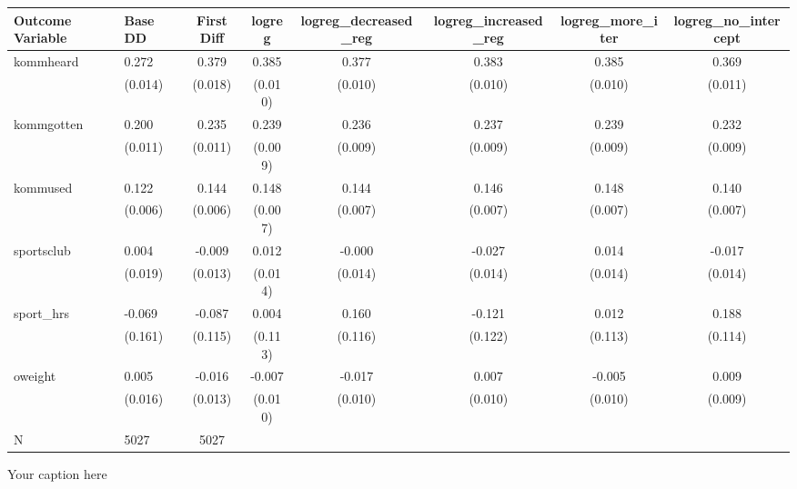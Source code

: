 \begin{adjustbox}{angle=90}
\begin{tabular}{llcccccc}
\hline
Outcome Variable & Base DD & First Diff & logreg & logreg_decreased_reg & logreg_increased_reg & logreg_more_iter & logreg_no_intercept \\
\hline
kommheard & 0.272 & 0.379 & 0.385 & 0.377 & 0.383 & 0.385 & 0.369 \\
  & (0.014) & (0.018) & (0.010) & (0.010) & (0.010) & (0.010) & (0.011) \\
kommgotten & 0.200 & 0.235 & 0.239 & 0.236 & 0.237 & 0.239 & 0.232 \\
  & (0.011) & (0.011) & (0.009) & (0.009) & (0.009) & (0.009) & (0.009) \\
kommused & 0.122 & 0.144 & 0.148 & 0.144 & 0.146 & 0.148 & 0.140 \\
  & (0.006) & (0.006) & (0.007) & (0.007) & (0.007) & (0.007) & (0.007) \\
sportsclub & 0.004 & -0.009 & 0.012 & -0.000 & -0.027 & 0.014 & -0.017 \\
  & (0.019) & (0.013) & (0.014) & (0.014) & (0.014) & (0.014) & (0.014) \\
sport_hrs & -0.069 & -0.087 & 0.004 & 0.160 & -0.121 & 0.012 & 0.188 \\
  & (0.161) & (0.115) & (0.113) & (0.116) & (0.122) & (0.113) & (0.114) \\
oweight & 0.005 & -0.016 & -0.007 & -0.017 & 0.007 & -0.005 & 0.009 \\
  & (0.016) & (0.013) & (0.010) & (0.010) & (0.010) & (0.010) & (0.009) \\
\hline
N & 5027 & 5027  &  &  &  &  \\
\hline
\end{tabular}
\caption{Your caption here}
\label{tab:your_label}
\end{adjustbox}